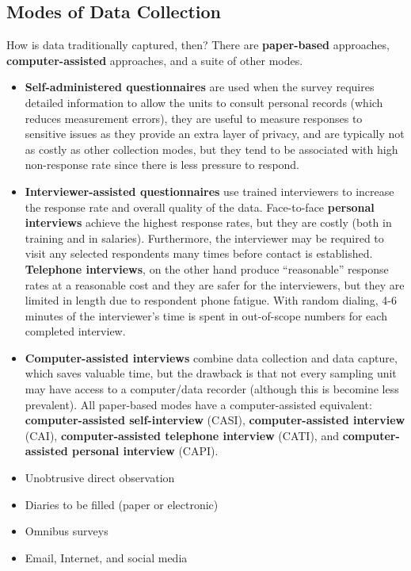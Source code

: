 \subsection{Modes of Data Collection}
How is data traditionally captured, then? There are \textbf{paper-based} approaches, \textbf{computer-assisted} approaches, and a suite of other modes.  
\begin{itemize}[noitemsep]
\item \textbf{Self-administered questionnaires} are used when the survey requires detailed information to allow the units to consult personal records (which reduces measurement errors), they are useful to measure responses to sensitive issues as they provide an extra layer of privacy, and are typically not as costly as other collection modes, but they tend to be associated with high non-response rate since there is less pressure to respond. 
\item \textbf{Interviewer-assisted questionnaires} use trained interviewers to  increase the response rate and overall quality of the data. Face-to-face \textbf{personal interviews} achieve the highest response rates, but they are costly (both in training and in salaries). Furthermore, the interviewer may be required to visit any selected respondents many times before contact is established. \textbf{Telephone interviews}, on the other hand produce ``reasonable'' response rates at a reasonable cost and they are safer for the interviewers, but they are limited in length due to respondent phone fatigue. With random dialing, 4-6 minutes of the interviewer's time is spent in out-of-scope numbers for each completed interview.
\item \textbf{Com\-puter-assisted interviews} combine data collection and data capture, which saves valuable time, but the drawback is that not every sampling unit may have access to a computer/data recorder (although this is becomine less prevalent). All paper-based modes have a computer-assisted equivalent: \textbf{com\-puter-as\-sisted self-interview} (CASI), \textbf{com\-puter-as\-sisted interview} (CAI),  \textbf{com\-puter-as\-sisted tele\-phone interview} (CATI), and 
\textbf{com\-puter-as\-sisted personal interview} (CAPI).
\item Unobtrusive direct observation
\item Diaries to be filled (paper or electronic)
\item Omnibus surveys
\item Email, Internet, and social media
\end{itemize}
